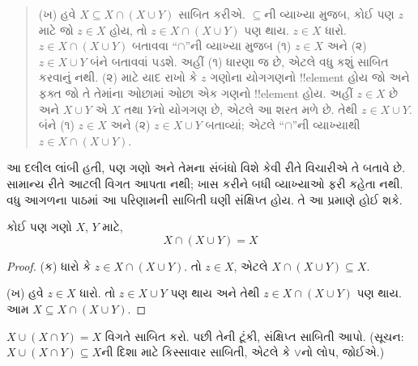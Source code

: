\documentclass[../../../include/open-logic-section]{subfiles}
\begin{document}
\begin{explain}
\begin{quote}
(ખ) હવે $X \subseteq X \cap (X \cup Y)$ સાબિત કરીએ.
$\subseteq$ની વ્યાખ્યા મુજબ, કોઈ પણ $z$ માટે
જો $z \in X$ હોય, તો $z \in X \cap (X \cup Y)$ પણ થાય.
$z \in X$ ધારો. $z \in X \cap (X \cup Y)$ બતાવવા
``$\cap$''ની વ્યાખ્યા મુજબ (૧) $z \in X$ અને
(૨) $z \in X \cup Y$ બંને બતાવવાં પડશે.
અહીં (૧) ધારણા જ છે, એટલે વધુ કશું સાબિત કરવાનું નથી.
(૨) માટે યાદ રાખો કે $z$ ગણોના યોગગણનો !!{element} હોય
જો અને ફક્ત જો તે તેમાંના ઓછામાં ઓછા એક ગણનો !!{element} હોય.
અહીં $z \in X$ છે અને $X \cup Y$ એ $X$ તથા $Y$નો યોગગણ છે,
એટલે આ શરત મળે છે. તેથી $z \in X \cup Y$.
બંને (૧) $z \in X$ અને (૨) $z \in X \cup Y$ બતાવ્યાં;
એટલે ``$\cap$''ની વ્યાખ્યાથી $z \in X \cap (X \cup Y)$.
\end{quote}

આ દલીલ લાંબી હતી, પણ ગણો અને તેમના સંબંધો વિશે કેવી રીતે
વિચારીએ તે બતાવે છે. સામાન્ય રીતે આટલી વિગત આપતા નથી;
ખાસ કરીને બધી વ્યાખ્યાઓ ફરી કહેતા નથી.
વધુ આગળના પાઠમાં આ પરિણામની સાબિતી ઘણી સંક્ષિપ્ત હોય.
તે આ પ્રમાણે હોઈ શકે.
\end{explain}

\begin{prop}[અવશોષણ]
કોઈ પણ ગણો $X$, $Y$ માટે,
\[
X \cap (X \cup Y) = X
\]
\end{prop}

\begin{proof}
(ક) ધારો કે $z \in X \cap (X \cup Y)$.
તો $z \in X$, એટલે $X \cap (X \cup Y) \subseteq X$.

(ખ) હવે $z \in X$ ધારો.
તો $z \in X \cup Y$ પણ થાય અને તેથી
$z \in X \cap (X \cup Y)$ પણ થાય.
આમ $X \subseteq X \cap (X \cup Y)$.
\end{proof}

\begin{prob}
$X \cup (X \cap Y) = X$ વિગતે સાબિત કરો.
પછી તેની ટૂંકી, સંક્ષિપ્ત સાબિતી આપો.
(સૂચન: $X \cup (X \cap Y) \subseteq X$ની દિશા માટે
કિસ્સાવાર સાબિતી, એટલે કે $\lor$નો લોપ, જોઈએ.)
\end{prob}
\end{document}
